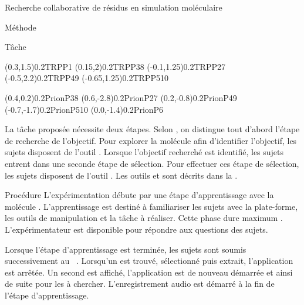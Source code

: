 \documentclass[myfrancais]{mythesis}
\begin{document}
\begin{mychapter}{Recherche collaborative de résidus en simulation moléculaire}
\begin{mysection}{Méthode}
\begin{mysubsection}{Tâche}
\begin{myfigure}
\begin{myps}
						\cnode(0.3,1.5){0.2}{TRPP1}
						\cnode(0.15,2){0.2}{TRPP38}
						\cnode(-0.1,1.25){0.2}{TRPP27}
						\cnode(-0.5,2.2){0.2}{TRPP49}
						\cnode(-0.65,1.25){0.2}{TRPP510}

						\cnode(0.4,0.2){0.2}{PrionP38}
						\cnode(0.6,-2.8){0.2}{PrionP27}
						\cnode(0.2,-0.8){0.2}{PrionP49}
						\cnode(-0.7,-1.7){0.2}{PrionP510}
						\cnode(0.0,-1.4){0.2}{PrionP6}
					\end{myps}
				\end{myfigure}

				La tâche proposée nécessite deux étapes.
				Selon , on distingue tout d'abord l'étape de recherche de l'objectif.
				Pour explorer la molécule afin d'identifier l'objectif, les sujets disposent de l'outil .
				Lorsque l'objectif recherché est identifié, les sujets entrent dans une seconde étape de sélection.
				Pour effectuer ces étape de sélection, les sujets disposent de l'outil .
				Les outils  et  sont décrits dans la .
			\end{mysubsection}
			\begin{mysubsection}{Procédure}
				L'expérimentation débute par une étape d'apprentissage avec la molécule \myTRPZIPPER.
				L'apprentissage est destiné à familiariser les sujets avec la plate-forme, les outils de manipulation et la tâche à réaliser.
				Cette phase dure maximum .
				L'expérimentateur est disponible pour répondre aux questions des sujets.

				Lorsque l'étape d'apprentissage est terminée, les sujets sont soumis successivement au ~.
				Lorsqu'un  est trouvé, sélectionné puis extrait, l'application est arrêtée.
				Un second  est affiché, l'application est de nouveau démarrée et ainsi de suite pour les  à chercher.
				L'enregistrement audio est démarré à la fin de l'étape d'apprentissage.


\end{mysubsection}
\end{mysection}
\end{mychapter}
\end{document}

